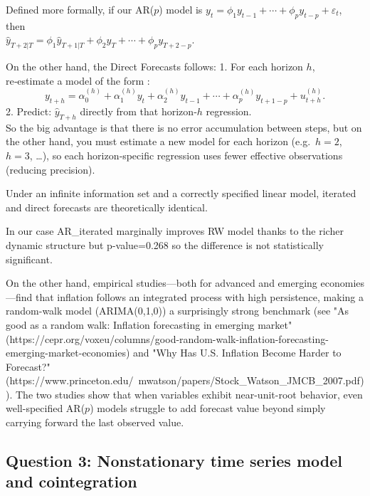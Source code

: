 \documentclass[a4paper,12pt]{article}
\theoremstyle{remark}
\begin{document}
Defined more formally, if our AR(\(p\)) model is  
 \(\displaystyle y_t = \phi_1 y_{t-1} + \cdots + \phi_p y_{t-p} + \varepsilon_t\),  \\
 then  \\
 \(\hat y_{T+2|T} = \phi_1 \hat y_{T+1|T} + \phi_2 y_T + \cdots + \phi_p y_{T+2-p}\).  

On the other hand, the Direct Forecasts follows:  
1. For each horizon \(h\), re‑estimate a model of the form : \\
   \[
     y_{t+h} = \alpha_0^{(h)} + \alpha_1^{(h)} y_t + \alpha_2^{(h)} y_{t-1} + \cdots + \alpha_p^{(h)} y_{t+1-p} + u_{t+h}^{(h)}.
   \]  
2. Predict: \(\hat y_{T+h}\) directly from that horizon‑\(h\) regression. \\
So the big advantage is that there is no error accumulation between steps, but on the other hand, you must estimate a new model for each horizon (e.g.\ \(h=2\), \(h=3\), …), so each horizon‑specific regression uses fewer effective observations (reducing precision).

Under an infinite information set and a correctly specified linear model, iterated and direct forecasts are theoretically identical.

In our case AR\_iterated marginally improves RW model thanks to the richer dynamic structure but p-value=0.268 so the difference is not statistically significant.

    On the other hand, empirical studies—both for advanced and emerging economies—find that inflation follows an integrated process with high persistence, making a random-walk model (ARIMA(0,1,0)) a surprisingly strong benchmark (see "As good as a random walk: Inflation forecasting in emerging market" (https://cepr.org/voxeu/columns/good-random-walk-inflation-forecasting-emerging-market-economies) and "Why Has U.S. Inflation Become Harder to Forecast?"(https://www.princeton.edu/~mwatson/papers/Stock\_Watson\_JMCB\_2007.pdf)).  The two studies show that when variables exhibit near-unit-root behavior, even well-specified AR(\(p\)) models struggle to add forecast value beyond simply carrying forward the last observed value.
    
\subsection*{Question 3: Nonstationary time series model and cointegration}
    
\end{document}
